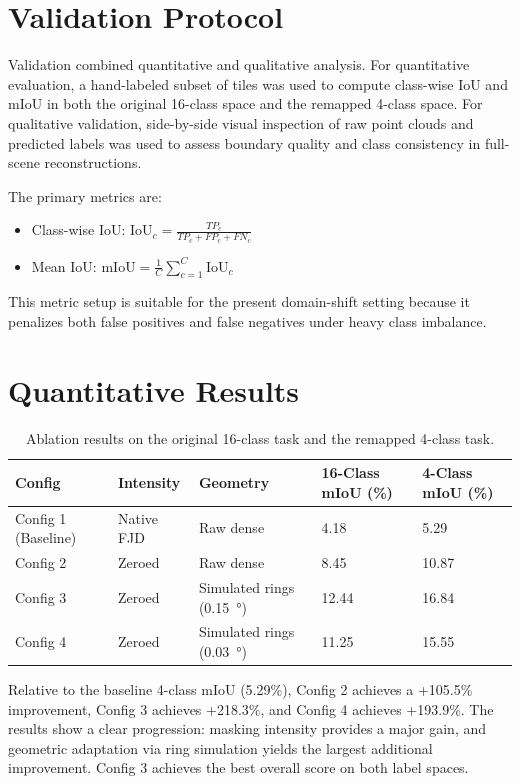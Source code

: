 \documentclass[12pt, a4paper]{report}
\begin{document}
\section{Validation Protocol}
Validation combined quantitative and qualitative analysis. For quantitative evaluation, a hand-labeled subset of tiles was used to compute class-wise \ac{IoU} and \ac{mIoU} in both the original 16-class space and the remapped 4-class space. For qualitative validation, side-by-side visual inspection of raw point clouds and predicted labels was used to assess boundary quality and class consistency in full-scene reconstructions.

The primary metrics are:
\begin{itemize}
    \item Class-wise \ac{IoU}: $\mathrm{IoU}_{c}=\frac{TP_{c}}{TP_{c}+FP_{c}+FN_{c}}$
    \item Mean \ac{IoU}: $\mathrm{mIoU}=\frac{1}{C}\sum_{c=1}^{C}\mathrm{IoU}_{c}$
\end{itemize}

This metric setup is suitable for the present domain-shift setting because it penalizes both false positives and false negatives under heavy class imbalance.

\section{Quantitative Results}

\begin{table}[h]
\centering
\caption{Ablation results on the original 16-class task and the remapped 4-class task.}
\label{tab:ablation-miou}
\begin{tabular}{|p{2.4cm}|p{2.0cm}|p{4.0cm}|p{2.1cm}|p{2.1cm}|}
\hline
\textbf{Config} & \textbf{Intensity} & \textbf{Geometry} & \textbf{16-Class mIoU (\%)} & \textbf{4-Class mIoU (\%)} \\
\hline
Config 1 (Baseline) & Native FJD & Raw dense & 4.18 & 5.29 \\
Config 2 & Zeroed & Raw dense & 8.45 & 10.87 \\
Config 3 & Zeroed & Simulated rings (\SI{0.15}{\degree}) & 12.44 & 16.84 \\
Config 4 & Zeroed & Simulated rings (\SI{0.03}{\degree}) & 11.25 & 15.55 \\
\hline
\end{tabular}
\end{table}

Relative to the baseline 4-class \ac{mIoU} (5.29\%), Config 2 achieves a +105.5\% improvement, Config 3 achieves +218.3\%, and Config 4 achieves +193.9\%. The results show a clear progression: masking intensity provides a major gain, and geometric adaptation via ring simulation yields the largest additional improvement. Config 3 achieves the best overall score on both label spaces.
\end{document}
